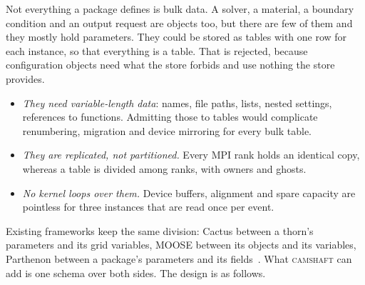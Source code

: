 \documentclass[11pt,a4paper]{article}
\newcommand{\camshaft}{\textsc{camshaft}}
\begin{document}
Not everything a package defines is bulk data.  A solver, a material, a
boundary condition and an output request are objects too, but there are few
of them and they mostly hold parameters.  They could be stored as tables
with one row for each instance, so that everything is a table.  That is
rejected, because configuration objects need what the store forbids and use
nothing the store provides.

\begin{itemize}
  \item \emph{They need variable-length data}: names, file paths, lists,
        nested settings, references to functions.  Admitting those to tables
        would complicate renumbering, migration and device mirroring for
        every bulk table.
  \item \emph{They are replicated, not partitioned.}  Every MPI rank holds
        an identical copy, whereas a table is divided among ranks, with
        owners and ghosts.
  \item \emph{No kernel loops over them.}  Device buffers, alignment and
        spare capacity are pointless for three instances that are read once
        per event.
\end{itemize}

Existing frameworks keep the same division: Cactus between a thorn's
parameters and its grid variables, MOOSE between its objects and its
variables, Parthenon between a package's parameters and its
fields~\cite{cactus,moose,parthenon}.  What \camshaft{} can add is one schema
over both sides.  The design is as follows.
\end{document}
